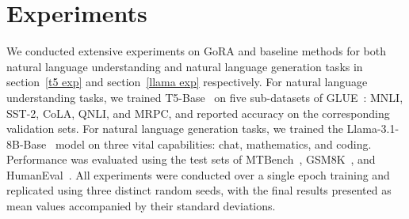 \section{Experiments}
We conducted extensive experiments on GoRA and baseline methods for both natural language understanding and natural language generation tasks in section~\ref{t5 exp} and section~\ref{llama exp} respectively. For natural language understanding tasks, we trained T5-Base~\citep{raffel2020t5} on five sub-datasets of GLUE~\citep{wang2018glue}: MNLI, SST-2, CoLA, QNLI, and MRPC, and reported accuracy on the corresponding validation sets. For natural language generation tasks, we trained the Llama-3.1-8B-Base~\citep{dubey2024llama3} model on three vital capabilities: chat, mathematics, and coding. Performance was evaluated using the test sets of MTBench~\citep{zheng2023mtbench}, GSM8K~\citep{cobbe2021gsm}, and HumanEval~\citep{chen2021human-eval}. All experiments were conducted over a single epoch training and replicated using three distinct random seeds, with the final results presented as mean values accompanied by their standard deviations.

